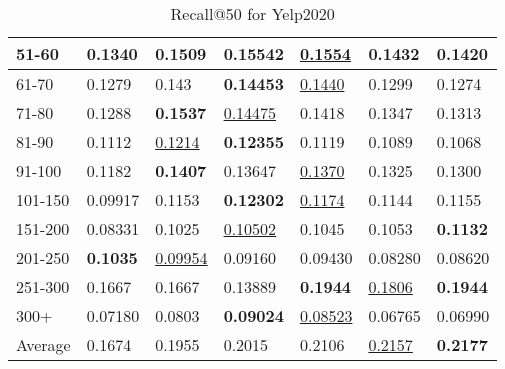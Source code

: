 \begin{table*}[]
\begin{tabular}{|l|l|l|l|l|l|l|}
    51-60     & 0.1340                         & 0.1509                         & \textbf{0.15542}               & \underline{0.1554}             & 0.1432                         & 0.1420                         \\ \hline
    61-70     & 0.1279                         & 0.143                          & \textbf{0.14453}               & \underline{0.1440}             & 0.1299                         & 0.1274                         \\ \hline
    71-80     & 0.1288                         & \textbf{0.1537}                & \underline{0.14475}            & 0.1418                         & 0.1347                         & 0.1313                         \\ \hline
    81-90     & 0.1112                         & \underline{0.1214}             & \textbf{0.12355}               & 0.1119                         & 0.1089                         & 0.1068                         \\ \hline
    91-100    & 0.1182                         & \textbf{0.1407}                & 0.13647                        & \underline{0.1370}             & 0.1325                         & 0.1300                         \\ \hline
    101-150   & 0.09917                        & 0.1153                         & \textbf{0.12302}               & \underline{0.1174}             & 0.1144                         & 0.1155                         \\ \hline
    151-200   & 0.08331                        & 0.1025                         & \underline{0.10502}            & 0.1045                         & 0.1053                         & \textbf{0.1132}                \\ \hline
    201-250   & \textbf{0.1035}                & \underline{0.09954}            & 0.09160                        & 0.09430                        & 0.08280                        & 0.08620                        \\ \hline
    251-300   & 0.1667                         & 0.1667                         & 0.13889                        & \textbf{0.1944}                & \underline{0.1806}             & \textbf{0.1944}                \\ \hline
    300+      & 0.07180                        & 0.0803                         & \textbf{0.09024}               & \underline{0.08523}            & 0.06765                        & 0.06990                        \\ \hline
    Average   & 0.1674                         & 0.1955                         & 0.2015                         & 0.2106                         & \underline{0.2157}             & \textbf{0.2177}                \\ \hline
    \end{tabular}
    \caption{Recall@50 for Yelp2020}
    \label{tab:yelp2020-recall-evaluation}
\end{table*}
